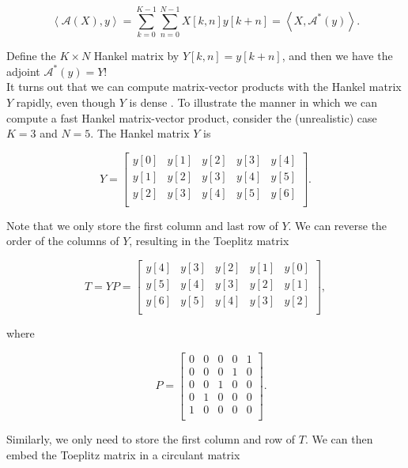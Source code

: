 \documentclass[journal]{IEEEtran}
\begin{document}
\[ \left\langle\mathcal{A}(X),y\right\rangle = \sum_{k=0}^{K-1}\sum_{n=0}^{N-1} X[k,n]y[k+n] = \left\langle X,\mathcal{A}^\ast(y)\right\rangle. \] 

\noindent Define the $K\times N$ Hankel matrix by $Y[k,n] = y[k+n]$, and then we have the adjoint $\mathcal{A}^\ast(y) = Y$!\\

It turns out that we can compute matrix-vector products with the Hankel matrix $Y$ rapidly, even though $Y$ is dense \cite{golub_1996}.  To illustrate the manner in which we can compute a fast Hankel matrix-vector product, consider the (unrealistic) case $K=3$ and $N=5$.  The Hankel matrix $Y$ is

   \[ Y = \begin{bmatrix} y[0] & y[1] & y[2] & y[3] & y[4]\\
                          y[1] & y[2] & y[3] & y[4] & y[5]\\
                          y[2] & y[3] & y[4] & y[5] & y[6]\\\end{bmatrix}. \] 

\noindent Note that we only store the first column and last row of $Y$.  We can reverse the order of the columns of $Y$, resulting in the Toeplitz matrix

\[ T = YP = \begin{bmatrix}
       y[4] & y[3] & y[2] & y[1] & y[0]\\
       y[5] & y[4] & y[3] & y[2] & y[1]\\
       y[6] & y[5] & y[4] & y[3] & y[2]\\\end{bmatrix}, \] 

\noindent where

\[               \quad P = \begin{bmatrix} 0 & 0 & 0 & 0 & 1\\
                                        0 & 0 & 0 & 1 & 0\\
                                        0 & 0 & 1 & 0 & 0\\
                                        0 & 1 & 0 & 0 & 0\\
                                        1 & 0 & 0 & 0 & 0\\ \end{bmatrix}. \] 

\noindent Similarly, we only need to store the first column and row of $T$.  We can then embed the Toeplitz matrix in a circulant matrix
\end{document}
